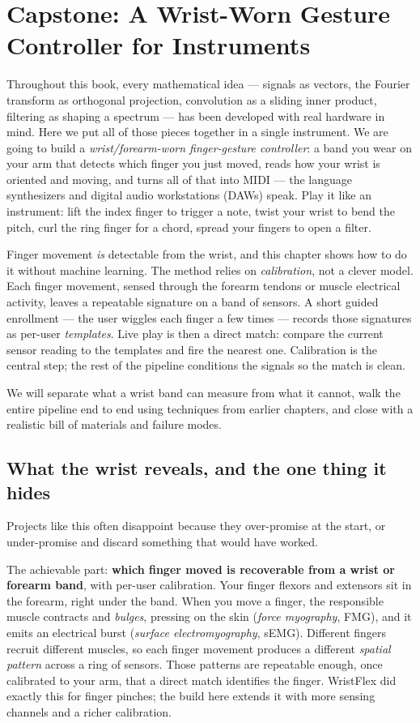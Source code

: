 \chapter{Capstone: A Wrist-Worn Gesture Controller for Instruments}

Throughout this book, every mathematical idea --- signals as vectors, the Fourier
transform as orthogonal projection, convolution as a sliding inner product, filtering
as shaping a spectrum --- has been developed with real hardware in mind. Here we put
all of those pieces together in a single instrument. We are going to build a
\emph{wrist/forearm-worn finger-gesture controller}: a band you wear on your arm
that detects which finger you just moved, reads how your wrist is oriented and
moving, and turns all of that into MIDI --- the language synthesizers and
digital audio workstations (DAWs) speak. Play it like an instrument: lift the index
finger to trigger a note, twist your wrist to bend the pitch, curl the ring
finger for a chord, spread your fingers to open a filter.

Finger movement \emph{is} detectable from the wrist, and this chapter shows how
to do it without machine learning. The method relies on \emph{calibration}, not
a clever model. Each finger movement, sensed through the forearm tendons or
muscle electrical activity, leaves a repeatable signature on a band of sensors.
A short guided enrollment --- the user wiggles each finger a few times --- records
those signatures as per-user \emph{templates}. Live play is then a direct match:
compare the current sensor reading to the templates and fire the nearest one.
Calibration is the central step; the rest of the pipeline conditions the
signals so the match is clean.

We will separate what a wrist band can measure from what it cannot, walk the entire pipeline end to end using techniques from earlier chapters, and close with a realistic bill of materials and failure modes.

\section{What the wrist reveals, and the one thing it hides}
\label{ch41:goal}

Projects like this often disappoint because
they over-promise at the start, or under-promise and discard something that
would have worked.

The achievable part: \textbf{which finger moved is
recoverable from a wrist or forearm band}, with per-user calibration. Your
finger flexors and extensors sit in the forearm, right under the band. When you
move a finger, the responsible muscle contracts and \emph{bulges}, pressing on
the skin (\emph{force myography}, FMG), and it emits an electrical burst
(\emph{surface electromyography}, sEMG). Different fingers recruit different
muscles, so each finger movement produces a different \emph{spatial pattern}
across a ring of sensors. Those patterns are repeatable enough, once calibrated
to your arm, that a direct match identifies the finger. WristFlex did exactly
this for finger pinches; the build here extends it with more sensing channels
and a richer calibration.

